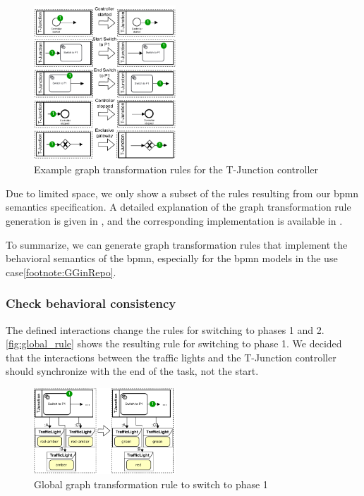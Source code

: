 \documentclass{jot}
\begin{document}
\begin{figure}[h]
    \centering
    \includegraphics[width=0.475\textwidth]{figures/bpmn_rules.pdf}
    \caption{Example graph transformation rules for the T-Junction controller}
    \label{fig:bpmn_example_rules}
\end{figure}

Due to limited space, we only show a subset of the rules resulting from our \gls*{bpmn} semantics specification.
A detailed explanation of the graph transformation rule generation is given in \cite{krauterFormalizationAnalysisBPMN2022}, and the corresponding implementation is available in \cite{krauterRewriteRuleGeneration2022}.

To summarize, we can generate graph transformation rules that implement the behavioral semantics of the \gls*{bpmn}, especially for the \gls*{bpmn} models in the use case\cref{footnote:GGinRepo}.


\subsubsection{Check behavioral consistency}
The defined interactions change the rules for switching to phases 1 and 2.
\autoref{fig:global_rule} shows the resulting rule for switching to phase 1.
We decided that the interactions between the traffic lights and the T-Junction controller should synchronize with the end of the task, not the start.

\begin{figure}[h]
    \centering
    \includegraphics[width=0.475\textwidth]{figures/global_rule.pdf}
    \caption{Global graph transformation rule to switch to phase 1}
    \label{fig:global_rule}
\end{figure}
\end{document}
